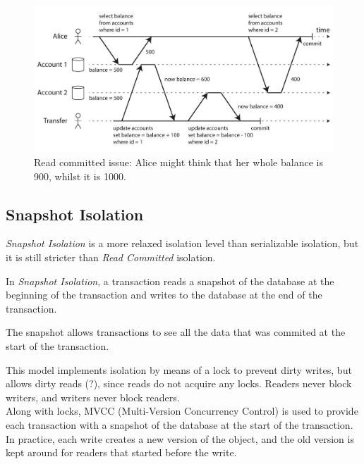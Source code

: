 \begin{figure}[htbp]
   \centering
   \includegraphics{images/12/readcommitted_issue.png}
   \caption{Read committed issue: Alice might think that her whole balance is 900, whilst it is 1000.}
   \label{fig:12/readcommitted_issue}
\end{figure}

\subsection{Snapshot Isolation}
\textit{Snapshot Isolation} is a more relaxed isolation level than serializable isolation, but it is still stricter than \textit{Read Committed} isolation.

In \textit{Snapshot Isolation}, a transaction reads a snapshot of the database at the beginning of the transaction and writes to the database at the end of the transaction.

The snapshot allows transactions to see all the data that was commited at the start of the transaction.



This model implements isolation by means of a lock to prevent dirty writes, but allows dirty reads (?), since reads do not acquire any locks.
Readers never block writers, and writers never block readers.\\
Along with locks, MVCC (Multi-Version Concurrency Control) is used to provide each transaction with a snapshot of the database at the start of the transaction.
In practice, each write creates a new version of the object, and the old version is kept around for readers that started before the write.

